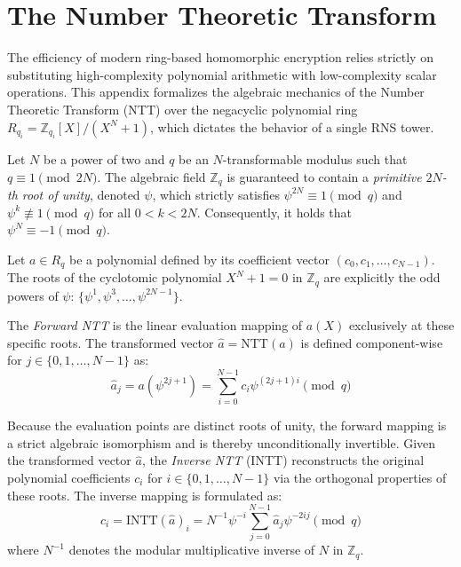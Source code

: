 \section{The Number Theoretic Transform}
\label{app:ntt}

The efficiency of modern ring-based homomorphic encryption relies strictly on substituting high-complexity polynomial arithmetic with low-complexity scalar operations. This appendix formalizes the algebraic mechanics of the Number Theoretic Transform (NTT) over the negacyclic polynomial ring $R_{q_i} = \mathbb{Z}_{q_i}[X]/(X^N+1)$, which dictates the behavior of a single RNS tower.

\begin{definition}
    Let $N$ be a power of two and $q$ be an $N$-transformable modulus such that $q \equiv 1 \pmod{2N}$. The algebraic field $\mathbb{Z}_q$ is guaranteed to contain a \emph{primitive $2N$-th root of unity}, denoted $\psi$, which strictly satisfies $\psi^{2N} \equiv 1 \pmod q$ and $\psi^k \not\equiv 1 \pmod q$ for all $0 < k < 2N$. Consequently, it holds that $\psi^N \equiv -1 \pmod q$.
\end{definition}

\begin{definition}
    Let $a \in R_q$ be a polynomial defined by its coefficient vector $(c_0, c_1, \dots, c_{N-1})$. The roots of the cyclotomic polynomial $X^N+1 = 0$ in $\mathbb{Z}_q$ are explicitly the odd powers of $\psi$: $\{\psi^1, \psi^3, \dots, \psi^{2N-1}\}$. 
    
    The \emph{Forward NTT} is the linear evaluation mapping of $a(X)$ exclusively at these specific roots. The transformed vector $\hat{a} = \text{NTT}(a)$ is defined component-wise for $j \in \{0, 1, \dots, N-1\}$ as:
    \begin{equation}
        \label{eq:forward-ntt}
        \hat{a}_j = a(\psi^{2j+1}) = \sum_{i=0}^{N-1} c_i \psi^{(2j+1)i} \pmod q
    \end{equation}
\end{definition}

\begin{definition}
    Because the evaluation points are distinct roots of unity, the forward mapping is a strict algebraic isomorphism and is thereby unconditionally invertible. Given the transformed vector $\hat{a}$, the \emph{Inverse NTT} (INTT) reconstructs the original polynomial coefficients $c_i$ for $i \in \{0, 1, \dots, N-1\}$ via the orthogonal properties of these roots. The inverse mapping is formulated as:
    \begin{equation}
        \label{eq:inverse-ntt}
        c_i = \text{INTT}(\hat{a})_i = N^{-1} \psi^{-i} \sum_{j=0}^{N-1} \hat{a}_j \psi^{-2ij} \pmod q
    \end{equation}
    where $N^{-1}$ denotes the modular multiplicative inverse of $N$ in $\mathbb{Z}_q$.
\end{definition}

